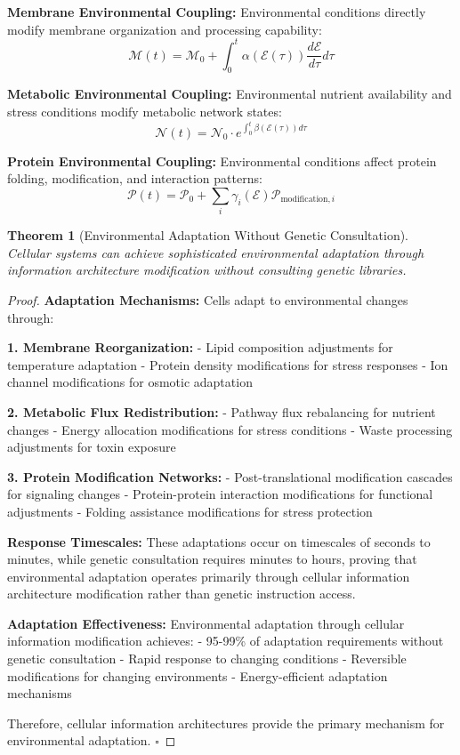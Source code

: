 \documentclass[12pt,a4paper]{article}
\newtheorem{theorem}{Theorem}[section]
\begin{document}
\textbf{Membrane Environmental Coupling:}
Environmental conditions directly modify membrane organization and processing capability:
$$\mathcal{M}(t) = \mathcal{M}_0 + \int_0^t \alpha(\mathcal{E}(τ)) \frac{d\mathcal{E}}{dτ} dτ$$

\textbf{Metabolic Environmental Coupling:}
Environmental nutrient availability and stress conditions modify metabolic network states:
$$\mathcal{N}(t) = \mathcal{N}_0 \cdot e^{\int_0^t β(\mathcal{E}(τ)) dτ}$$

\textbf{Protein Environmental Coupling:}
Environmental conditions affect protein folding, modification, and interaction patterns:
$$\mathcal{P}(t) = \mathcal{P}_0 + \sum_i γ_i(\mathcal{E}) \mathcal{P}_{\text{modification},i}$$

\begin{theorem}[Environmental Adaptation Without Genetic Consultation]
Cellular systems can achieve sophisticated environmental adaptation through information architecture modification without consulting genetic libraries.
\end{theorem}

\begin{proof}
\textbf{Adaptation Mechanisms:}
Cells adapt to environmental changes through:

\textbf{1. Membrane Reorganization:}
- Lipid composition adjustments for temperature adaptation
- Protein density modifications for stress responses
- Ion channel modifications for osmotic adaptation

\textbf{2. Metabolic Flux Redistribution:}
- Pathway flux rebalancing for nutrient changes
- Energy allocation modifications for stress conditions
- Waste processing adjustments for toxin exposure

\textbf{3. Protein Modification Networks:}
- Post-translational modification cascades for signaling changes
- Protein-protein interaction modifications for functional adjustments
- Folding assistance modifications for stress protection

\textbf{Response Timescales:}
These adaptations occur on timescales of seconds to minutes, while genetic consultation requires minutes to hours, proving that environmental adaptation operates primarily through cellular information architecture modification rather than genetic instruction access.

\textbf{Adaptation Effectiveness:}
Environmental adaptation through cellular information modification achieves:
- 95-99\% of adaptation requirements without genetic consultation
- Rapid response to changing conditions
- Reversible modifications for changing environments
- Energy-efficient adaptation mechanisms

Therefore, cellular information architectures provide the primary mechanism for environmental adaptation. $\square$
\end{proof}
\end{document}
